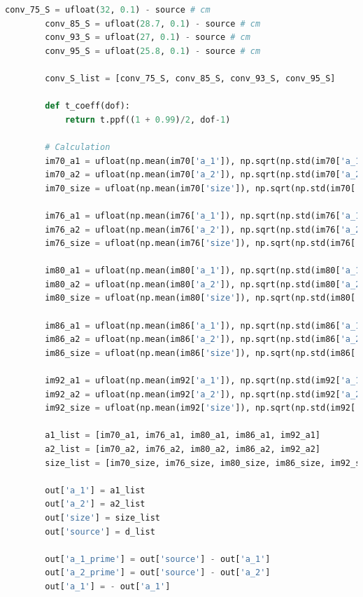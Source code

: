 \documentclass[a4paper,11pt]{article}
\begin{document}
\begin{lstlisting}[language=Python, basicstyle=\tiny, breaklines=true, postbreak=\mbox{\textbackslashspace}]
        conv_75_S = ufloat(32, 0.1) - source # cm
        conv_85_S = ufloat(28.7, 0.1) - source # cm
        conv_93_S = ufloat(27, 0.1) - source # cm
        conv_95_S = ufloat(25.8, 0.1) - source # cm

        conv_S_list = [conv_75_S, conv_85_S, conv_93_S, conv_95_S]

        def t_coeff(dof):
            return t.ppf((1 + 0.99)/2, dof-1)

        # Calculation 
        im70_a1 = ufloat(np.mean(im70['a_1']), np.sqrt(np.std(im70['a_1'])**2 + 0.1**2)) - source
        im70_a2 = ufloat(np.mean(im70['a_2']), np.sqrt(np.std(im70['a_2'])**2 + 0.1**2)) - source
        im70_size = ufloat(np.mean(im70['size']), np.sqrt(np.std(im70['size'])**2 + 0.1**2))

        im76_a1 = ufloat(np.mean(im76['a_1']), np.sqrt(np.std(im76['a_1'])**2 + 0.1**2)) - source
        im76_a2 = ufloat(np.mean(im76['a_2']), np.sqrt(np.std(im76['a_2'])**2 + 0.1**2)) - source
        im76_size = ufloat(np.mean(im76['size']), np.sqrt(np.std(im76['size'])**2 + 0.1**2))

        im80_a1 = ufloat(np.mean(im80['a_1']), np.sqrt(np.std(im80['a_1'])**2 + 0.1**2)) - source
        im80_a2 = ufloat(np.mean(im80['a_2']), np.sqrt(np.std(im80['a_2'])**2 + 0.1**2)) - source
        im80_size = ufloat(np.mean(im80['size']), np.sqrt(np.std(im80['size'])**2 + 0.1**2))

        im86_a1 = ufloat(np.mean(im86['a_1']), np.sqrt(np.std(im86['a_1'])**2 + 0.1**2)) - source
        im86_a2 = ufloat(np.mean(im86['a_2']), np.sqrt(np.std(im86['a_2'])**2 + 0.1**2)) - source
        im86_size = ufloat(np.mean(im86['size']), np.sqrt(np.std(im86['size'])**2 + 0.1**2))

        im92_a1 = ufloat(np.mean(im92['a_1']), np.sqrt(np.std(im92['a_1'])**2 + 0.1**2)) - source
        im92_a2 = ufloat(np.mean(im92['a_2']), np.sqrt(np.std(im92['a_2'])**2 + 0.1**2)) - source
        im92_size = ufloat(np.mean(im92['size']), np.sqrt(np.std(im92['size'])**2 + 0.1**2))

        a1_list = [im70_a1, im76_a1, im80_a1, im86_a1, im92_a1]
        a2_list = [im70_a2, im76_a2, im80_a2, im86_a2, im92_a2]
        size_list = [im70_size, im76_size, im80_size, im86_size, im92_size]

        out['a_1'] = a1_list
        out['a_2'] = a2_list
        out['size'] = size_list
        out['source'] = d_list

        out['a_1_prime'] = out['source'] - out['a_1']
        out['a_2_prime'] = out['source'] - out['a_2']
        out['a_1'] = - out['a_1']


\end{lstlisting}
\end{document}
